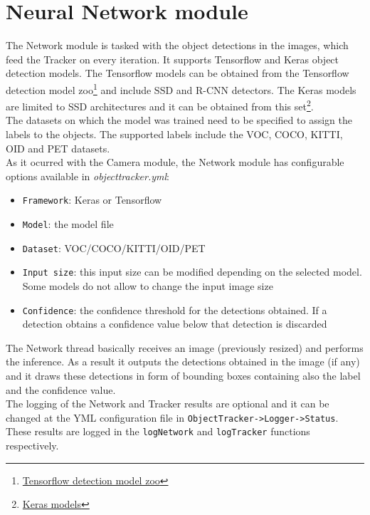 \section{Neural Network module}\label{neural_networks}
The Network module is tasked with the object detections in the images, which feed the Tracker on every iteration. It supports Tensorflow and Keras object detection models. The Tensorflow models can be obtained from the Tensorflow detection model zoo\footnote{\href {https://github.com/tensorflow/models/blob/master/research/object_detection/g3doc/detection_model_zoo.md}{Tensorflow detection model zoo}} and include SSD and R-CNN detectors. The Keras models are limited to SSD architectures and it can be obtained from this set\footnote{\href {https://github.com/pierluigiferrari/ssd_keras#download-the-original-trained-model-weights}{Keras models}}.\\
The datasets on which the model was trained need to be specified to assign the labels to the objects. The supported labels include the VOC, COCO, KITTI, OID and PET datasets.\\ As it ocurred with the Camera module, the Network module has configurable options available in \textit{objecttracker.yml}:
\begin{itemize}
    \item \texttt{Framework}: Keras or Tensorflow
    \item \texttt{Model}: the model file
    \item \texttt{Dataset}: VOC/COCO/KITTI/OID/PET
    \item \texttt{Input size}: this input size can be modified depending on the selected model. Some models do not allow to change the input image size
    \item \texttt{Confidence}: the confidence threshold for the detections obtained. If a detection obtains a confidence value below that detection is discarded
\end{itemize}
The Network thread basically receives an image (previously resized) and performs the inference. As a result it outputs the detections obtained in the image (if any) and it draws these detections in form of bounding boxes containing also the label and the confidence value.\\
The logging of the Network and Tracker results are optional and it can be changed at the YML configuration file in \texttt{ObjectTracker->Logger->Status}. These results are logged in the \texttt{logNetwork} and \texttt{logTracker} functions respectively.\\

